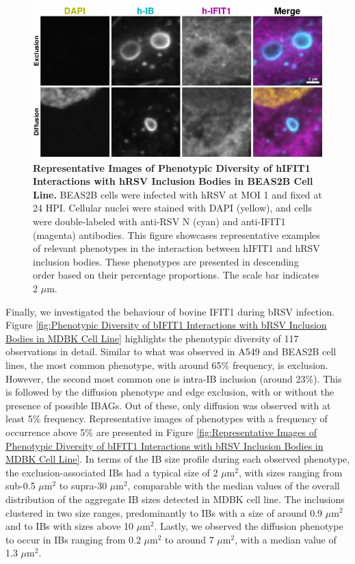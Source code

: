\begin{figure}
    \centering
    \includegraphics[width=1\linewidth]{08. Chapter 3/Figs/02. Infection/01. IFIT1/06. beas2b i1.pdf}
    \caption[Representative Images of Phenotypic Diversity of hIFIT1 Interactions with hRSV Inclusion Bodies in BEAS2B Cell Line.]{\textbf{Representative Images of Phenotypic Diversity of hIFIT1 Interactions with hRSV Inclusion Bodies in BEAS2B Cell Line.} BEAS2B cells were infected with hRSV at MOI 1 and fixed at 24 HPI. Cellular nuclei were stained with DAPI (yellow), and cells were double-labeled with anti-RSV N (cyan) and anti-IFIT1 (magenta) antibodies. This figure showcases representative examples of relevant phenotypes in the interaction between hIFIT1 and hRSV inclusion bodies. These phenotypes are presented in descending order based on their percentage proportions. The scale bar indicates 2 \(\mu \mbox{m}\).}
    \label{fig:Representative Images of Phenotypic Diversity of hIFIT1 Interactions with hRSV Inclusion Bodies in BEAS2B Cell Line}
\end{figure}

Finally, we investigated the behaviour of bovine IFIT1 during bRSV infection. Figure \ref{fig:Phenotypic Diversity of bIFIT1 Interactions with bRSV Inclusion Bodies in MDBK Cell Line} highlights the phenotypic diversity of 117 observations in detail. Similar to what was observed in A549 and BEAS2B cell lines, the most common phenotype, with around 65\% frequency, is exclusion. However, the second most common one is intra-IB inclusion (around 23\%). This is followed by the diffusion phenotype and edge exclusion, with or without the presence of possible IBAGs. Out of these, only diffusion was observed with at least 5\% frequency. Representative images of phenotypes with a frequency of occurrence above 5\% are presented in Figure \ref{fig:Representative Images of Phenotypic Diversity of bIFIT1 Interactions with bRSV Inclusion Bodies in MDBK Cell Line}. In terms of the IB size profile during each observed phenotype, the exclusion-associated IBs had a typical size of 2 \(\mu \mbox{m}^2\), with sizes ranging from sub-0.5 \(\mu \mbox{m}^2\) to supra-30 \(\mu \mbox{m}^2\), comparable with the median values of the overall distribution of the aggregate IB sizes detected in MDBK cell line. The inclusions clustered in two size ranges, predominantly to IBs with a size of around 0.9 \(\mu \mbox{m}^2\) and to IBs with sizes above 10 \(\mu \mbox{m}^2\). Lastly, we observed the diffusion phenotype to occur in IBs ranging from 0.2 \(\mu \mbox{m}^2\) to around 7 \(\mu \mbox{m}^2\), with a median value of 1.3 \(\mu \mbox{m}^2\).

